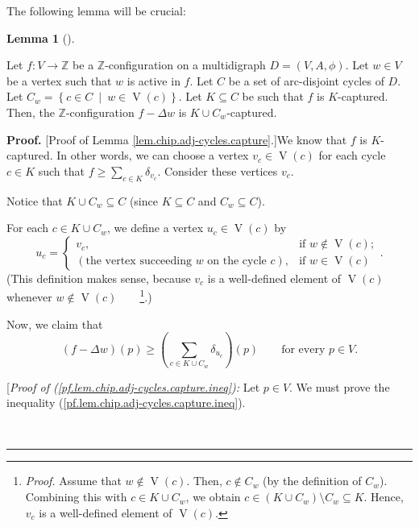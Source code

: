 \documentclass[numbers=enddot,12pt,final,onecolumn,notitlepage]{scrartcl}%
\theoremstyle{definition}
\newtheorem{lem}[theo]{Lemma}
\newenvironment{lemma}[1][]
{\begin{lem}[#1]\begin{leftbar}}
{\end{leftbar}\end{lem}}
\newenvironment{proof}[1][Proof]{\noindent\textbf{#1.} }{\ \rule{0.5em}{0.5em}}
\let\sumnonlimits\sum
\renewcommand{\sum}{\sumnonlimits\limits}
\newcommand{\ZZ}{\mathbb{Z}}
\begin{document}
The following lemma will be crucial:

\begin{lemma}
\label{lem.chip.adj-cycles.capture}Let $f:V\rightarrow\mathbb{Z}$ be a
$\ZZ$-configuration on a multidigraph $D=\left(  V,A,\phi\right)  $. Let
$w\in V$ be a vertex such that $w$ is active in $f$. Let $C$ be a set of
arc-disjoint cycles of $D$. Let $C_{w}=\left\{  c\in C\ \mid\ w\in
\operatorname*{V}\left(  c\right)  \right\}  $. Let $K\subseteq C$ be such
that $f$ is $K$-captured.
Then, the $\ZZ$-configuration $f-\Delta w$ is $K\cup C_{w}$-captured.
\end{lemma}

\begin{proof}
[Proof of Lemma \ref{lem.chip.adj-cycles.capture}.]We know that $f$ is
$K$-captured. In other words, we can choose a vertex $v_{c}\in
\operatorname*{V}\left(  c\right)  $ for each cycle $c\in K$ such that
$f\geq\sum_{c\in K}\delta_{v_{c}}$. Consider these vertices $v_{c}$.

Notice that $K\cup C_{w}\subseteq C$ (since $K\subseteq C$ and $C_{w}\subseteq
C$).

For each $c\in K\cup C_{w}$, we define a vertex $u_{c}\in\operatorname*{V}%
\left(  c\right)  $ by%
\[
u_{c}=%
\begin{cases}
v_{c}, & \text{if }w\notin\operatorname*{V}\left(  c\right)  ;\\
\left(  \text{the vertex succeeding }w\text{ on the cycle }c\right)  , &
\text{if }w\in\operatorname*{V}\left(  c\right)
\end{cases}
.
\]
(This definition makes sense, because $v_{c}$ is a well-defined element of
$\operatorname*{V}\left(  c\right)  $ whenever $w\notin\operatorname*{V}%
\left(  c\right)  $\ \ \ \ \footnote{\textit{Proof.} Assume that
$w\notin\operatorname*{V}\left(  c\right)  $. Then, $c\notin C_{w}$ (by the
definition of $C_{w}$). Combining this with $c\in K\cup C_{w}$, we obtain
$c\in\left(  K\cup C_{w}\right)  \setminus C_{w}\subseteq K$. Hence, $v_{c}$
is a well-defined element of $\operatorname*{V}\left(  c\right)  $.}.)

Now, we claim that%
\begin{equation}
\left(  f-\Delta w\right)  \left(  p\right)  \geq\left(  \sum_{c\in K\cup
C_{w}}\delta_{u_{c}}\right)  \left(  p\right)  \qquad\text{for every }p\in
V.\label{pf.lem.chip.adj-cycles.capture.ineq}%
\end{equation}


[\textit{Proof of (\ref{pf.lem.chip.adj-cycles.capture.ineq}):} Let $p\in V$.
We must prove the inequality (\ref{pf.lem.chip.adj-cycles.capture.ineq}).


\end{proof}
\end{document}
